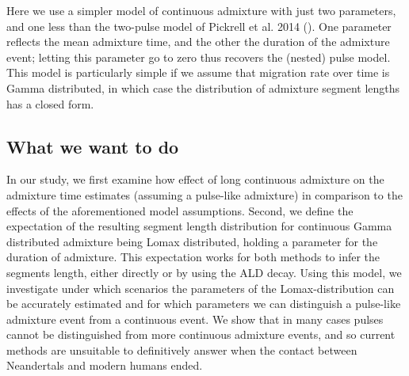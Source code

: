 \documentclass[]{article}
\begin{document}
Here we use a simpler model of continuous admixture with just two parameters, and one less than the two-pulse model of Pickrell et al. 2014 (\cite{pickrell_ancient_2014}). One parameter reflects the mean admixture time, and the other the duration of the admixture event; letting this parameter go to zero thus recovers the (nested) pulse model. 
This model is particularly simple if we assume that migration rate over time is Gamma distributed, in which case the distribution of admixture segment lengths has a closed form.

\subsection{What we want to do}\label{what-we-want-to-do}
In our  study, we first examine how  effect of long
continuous admixture on the admixture time estimates (assuming a pulse-like admixture) in comparison to
the effects of the aforementioned model assumptions. Second, we define
the expectation of the resulting segment length distribution for
continuous Gamma distributed admixture being Lomax distributed, holding
a parameter for the duration of admixture. This expectation works for
both methods to infer the segments length, either directly or by using
the ALD decay. Using this model, we investigate under which scenarios
the parameters of the Lomax-distribution can be accurately estimated and
for which parameters we can distinguish a pulse-like admixture event
from a continuous event. We show that in many cases pulses cannot be
distinguished from more continuous admixture events, and so current
methods are unsuitable to definitively answer when the contact between
Neandertals and modern humans ended.
\end{document}
